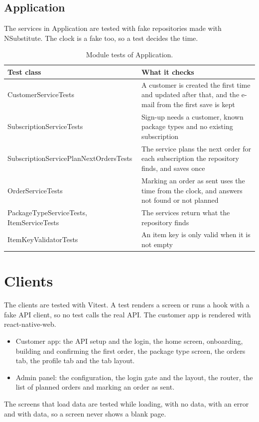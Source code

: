 \documentclass[a4paper,11pt]{article}
\begin{document}
\subsection{Application}
The services in Application are tested with fake repositories made with NSubstitute. The clock is a fake too, so a test decides the time.

\begin{table}[H]
\centering
\small
\begin{tabular}{@{}p{7.1cm}p{7.1cm}@{}}
\hline
\textbf{Test class} & \textbf{What it checks} \\
\hline
CustomerServiceTests & A customer is created the first time and updated after that, and the e-mail from the first save is kept \\
SubscriptionServiceTests & Sign-up needs a customer, known package types and no existing subscription \\
SubscriptionServicePlanNextOrdersTests & The service plans the next order for each subscription the repository finds, and saves once \\
OrderServiceTests & Marking an order as sent uses the time from the clock, and answers not found or not planned \\
PackageTypeServiceTests, ItemServiceTests & The services return what the repository finds \\
ItemKeyValidatorTests & An item key is only valid when it is not empty \\
\hline
\end{tabular}
\caption{Module tests of Application.}
\end{table}

\section{Clients}
The clients are tested with Vitest. A test renders a screen or runs a hook with a fake API client, so no test calls the real API. The customer app is rendered with react-native-web.

\begin{itemize}
  \item Customer app: the API setup and the login, the home screen, onboarding, building and confirming the first order, the package type screen, the orders tab, the profile tab and the tab layout.
  \item Admin panel: the configuration, the login gate and the layout, the router, the list of planned orders and marking an order as sent.
\end{itemize}

The screens that load data are tested while loading, with no data, with an error and with data, so a screen never shows a blank page.
\end{document}

